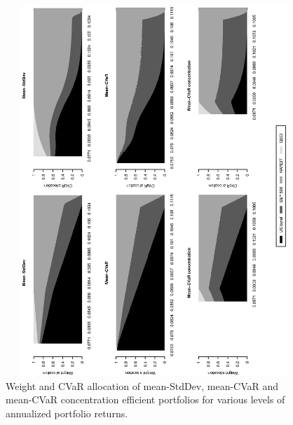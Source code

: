 \documentclass[12pt,a4paper]{article}
\begin{document}
\begin{figure}[tb]
\caption{Weight and CVaR allocation of mean-StdDev, mean-CVaR and mean-CVaR concentration efficient
portfolios for various levels of annualized portfolio returns. \label{fig:EfficientFrontier_weights}   }
\includegraphics[width=16cm,height=14cm,angle=270]{stackedweightsriskcont_efficientfrontier_clean.eps}
\end{figure}
\end{document}
